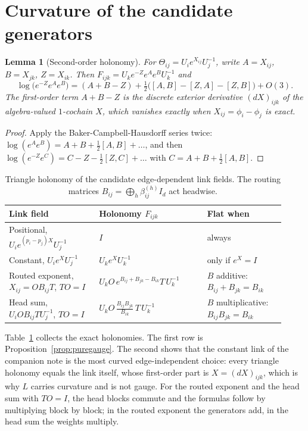 \documentclass[11pt]{article}
\newtheorem{lemma}[proposition]{Lemma}
\theoremstyle{definition}
\theoremstyle{remark}
\begin{document}
\section{Curvature of the candidate generators}
\label{sec:candidates}

\begin{lemma}[Second-order holonomy]
\label{lem:bch}
For $\Theta_{ij}=U_ie^{X_{ij}}U_j^{-1}$, write $A=X_{ij}$, $B=X_{jk}$, $Z=X_{ik}$. Then $F_{ijk}=U_ke^{-Z}e^{A}e^{B}U_k^{-1}$ and
\begin{equation}
\log\big(e^{-Z}e^{A}e^{B}\big)=(A+B-Z)+\tfrac12\big([A,B]-[Z,A]-[Z,B]\big)+O(3).
\label{eq:bch}
\end{equation}
The first-order term $A+B-Z$ is the discrete exterior derivative $(dX)_{ijk}$ of the algebra-valued $1$-cochain $X$, which vanishes exactly when $X_{ij}=\phi_i-\phi_j$ is exact.
\end{lemma}

\begin{proof}
Apply the Baker-Campbell-Hausdorff series \cite{hall2015} twice: $\log(e^{A}e^{B})=A+B+\tfrac12[A,B]+\dots$, and then $\log(e^{-Z}e^{C})=C-Z-\tfrac12[Z,C]+\dots$ with $C=A+B+\tfrac12[A,B]$.
\end{proof}

\begin{table}[ht]
\centering
\small
\begin{tabular}{>{\raggedright}p{0.30\linewidth}>{\raggedright}p{0.36\linewidth}>{\raggedright\arraybackslash}p{0.26\linewidth}}
\toprule
Link field & Holonomy $F_{ijk}$ & Flat when \\
\midrule
Positional, $U_ie^{(p_i-p_j)X}U_j^{-1}$ & $I$ & always \\
Constant, $U_ie^{X}U_j^{-1}$ & $U_ke^{X}U_k^{-1}$ & only if $e^{X}=I$ \\
Routed exponent, $X_{ij}=OB_{ij}T$, $TO=I$ & $U_kO\,e^{B_{ij}+B_{jk}-B_{ik}}T\,U_k^{-1}$ & $B$ additive: $B_{ij}+B_{jk}=B_{ik}$ \\
Head sum, $U_iOB_{ij}TU_j^{-1}$, $TO=I$ & $U_kO\,\frac{B_{ij}B_{jk}}{B_{ik}}\,T\,U_k^{-1}$ & $B$ multiplicative: $B_{ij}B_{jk}=B_{ik}$ \\
\bottomrule
\end{tabular}
\caption{Triangle holonomy of the candidate edge-dependent link fields. The routing matrices $B_{ij}=\bigoplus_h\beta_{ij}^{(h)}I_d$ act headwise.}
\label{tab:candidates}
\end{table}

Table~\ref{tab:candidates} collects the exact holonomies. The first row is Proposition~\ref{prop:puregauge}. The second shows that the constant link of the companion note is the most curved edge-independent choice: every triangle holonomy equals the link itself, whose first-order part is $X=(dX)_{ijk}$, which is why $L$ carries curvature and is not gauge. For the routed exponent and the head sum with $TO=I$, the head blocks commute and the formulas follow by multiplying block by block; in the routed exponent the generators add, in the head sum the weights multiply.
\end{document}
